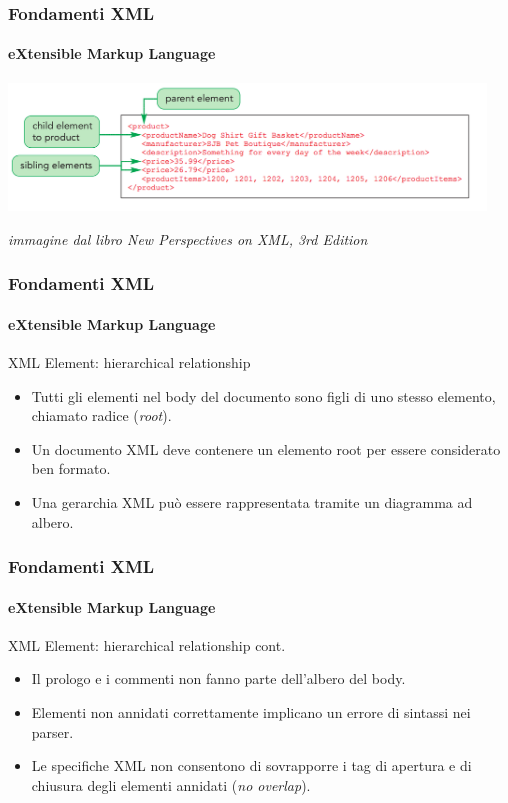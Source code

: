 \begin{frame}
	\frametitle{Fondamenti XML}
	\framesubtitle{eXtensible Markup Language}
	\addtocounter{nframe}{1}

	\begin{center}
		\includegraphics[width=0.95\textwidth]{imgs/XML-Parent-Child-Sibling.png}
    \end{center}
\begin{tiny}\textit{immagine dal libro New Perspectives on XML, 3rd Edition}\end{tiny}

\end{frame}

\begin{frame}
    \frametitle{Fondamenti XML}
    \framesubtitle{eXtensible Markup Language}
    \addtocounter{nframe}{1}

	\begin{block}{XML Element: hierarchical relationship}
		\begin{itemize}
			\item Tutti gli elementi nel body del documento sono figli di uno stesso elemento, chiamato radice (\textit{root}).
			\item Un documento XML deve contenere un elemento root per essere considerato ben formato.
			\item Una gerarchia XML può essere rappresentata tramite un diagramma ad albero.
		\end{itemize}
	\end{block}

\end{frame}

\begin{frame}
    \frametitle{Fondamenti XML}
    \framesubtitle{eXtensible Markup Language}
    \addtocounter{nframe}{1}

	\begin{block}{XML Element: hierarchical relationship cont.}
		\begin{itemize}
			\item Il prologo e i commenti non fanno parte dell'albero del body.
			\item Elementi non annidati correttamente implicano un errore di sintassi nei parser.
			\item Le specifiche XML non consentono di sovrapporre i tag di apertura e di chiusura degli elementi annidati (\textit{no overlap}).
		\end{itemize}
	\end{block}

\end{frame}



